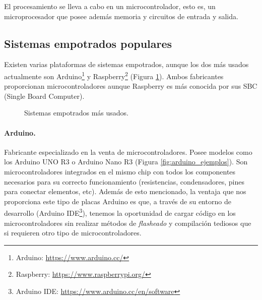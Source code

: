 El procesamiento se lleva a cabo en un microcontrolador, esto es, un microprocesador que posee además memoria y circuitos de entrada y salida. 

\subsection{Sistemas empotrados populares}
Existen varias plataformas de sistemas empotrados, aunque los dos más usados actualmente son Arduino\footnote{Arduino: \url{https://www.arduino.cc/}} y Raspberry\footnote{Raspberry: \url{https://www.raspberrypi.org/}} (Figura \ref{fig:logos_empotrados}). Ambos fabricantes proporcionan microcontroladores aunque Raspberry es más conocida por sus SBC (Single Board Computer).

\begin{figure}[h!]
  \begin{center}
    \subcapcentertrue
    \hspace{2cm}
  \end{center}
\caption{Sistemas empotrados más usados.}
\label{fig:logos_empotrados}
\end{figure}

\paragraph{Arduino.} Fabricante especializado en la venta de microcontroladores. Posee modelos como los Arduino UNO R3 o Arduino Nano R3 (Figura \ref{fig:arduino_ejemplos}). Son microcontroladores integrados en el mismo chip con todos los componentes necesarios para su correcto funcionamiento (resistencias, condensadores, pines para conectar elementos, etc). Además de esto mencionado, la ventaja que nos proporciona este tipo de placas Arduino es que, a través de su entorno de desarrollo (Arduino IDE\footnote{Arduino IDE: \url{https://www.arduino.cc/en/software}}), tenemos la oportunidad de cargar código en los microcontroladores sin realizar métodos de \textit{flasheado} y compilación tediosos que si requieren otro tipo de microcontroladores.

